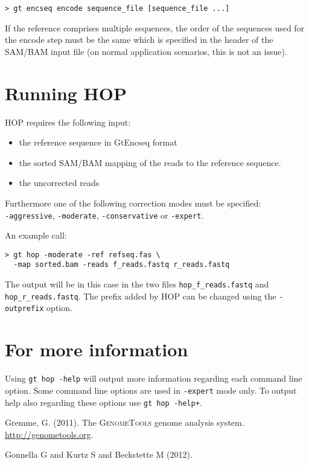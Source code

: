 \documentclass[12pt,titlepage]{article}
\newcommand{\Hop}{{HOP}\xspace}
\begin{document}
\begin{footnotesize}
\begin{verbatim}
> gt encseq encode sequence_file [sequence_file ...]
\end{verbatim}
\end{footnotesize}

If the reference comprises multiple sequences, the order of the sequences
used for the encode step must be the same which is specified in the header
of the SAM/BAM input file (on normal application scenarios,
this is not an issue).

\section{Running \Hop}

\Hop requires the following input:
\begin{itemize}
\item the reference sequence in GtEncseq format
\item the sorted SAM/BAM mapping of the reads to the reference sequence.
\item the uncorrected reads
\end{itemize}

Furthermore one of the following correction modes must be specified:\\
\texttt{-aggressive},
\texttt{-moderate},
\texttt{-conservative} or
\texttt{-expert}.

An example call:

\begin{footnotesize}
\begin{verbatim}
> gt hop -moderate -ref refseq.fas \
  -map sorted.bam -reads f_reads.fastq r_reads.fastq
\end{verbatim}
\end{footnotesize}

The output will be in this case in the two files
\texttt{hop\_f\_reads.fastq} and \texttt{hop\_r\_reads.fastq}.
The prefix added by \Hop can be changed using the \texttt{-outprefix}
option.

\section{For more information}

Using \texttt{gt hop -help} will output more information regarding
each command line option. Some command line options are used in
\texttt{-expert} mode only. To output help also regarding these
options use \texttt{gt hop -help+}.

\begin{thebibliography}{1}

Gremme, G. (2011).
\newblock The \textsc{GenomeTools} genome analysis system.
  \url{http://genometools.org}.

Gonnella G and Kurtz S and Beckstette M (2012).

\end{thebibliography}
\end{document}
